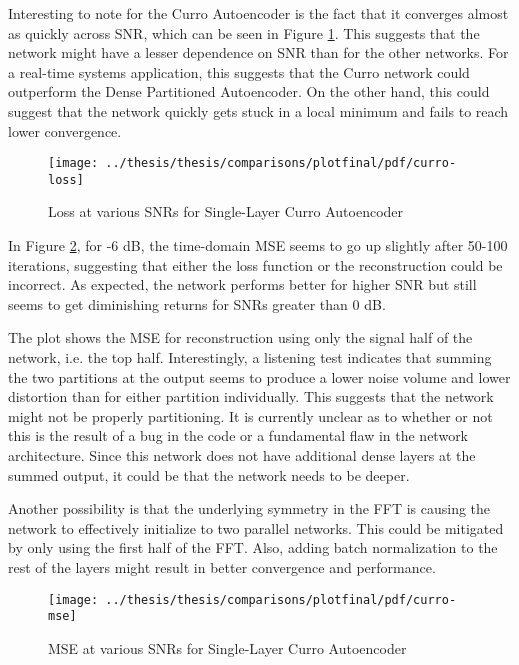 Interesting to note for the Curro Autoencoder is the fact that it converges almost as quickly across SNR, which can be seen in Figure \ref{fig:curro-loss}. This suggests that the network might have a lesser dependence on SNR than for the other networks. For a real-time systems application, this suggests that the Curro network could outperform the Dense Partitioned Autoencoder. On the other hand, this could suggest that the network quickly gets stuck in a local minimum and fails to reach lower convergence.

\begin{figure}[!ht]
\centering
\texttt{[image: ../thesis/thesis/comparisons/plotfinal/pdf/curro-loss]}
\caption{Loss at various SNRs for Single-Layer Curro Autoencoder}\label{fig:curro-loss}
\end{figure}

In Figure \ref{fig:curro-mse}, for -6 dB, the time-domain MSE seems to go up slightly after 50-100 iterations, suggesting that either the loss function or the reconstruction could be incorrect. As expected, the network performs better for higher SNR but still seems to get diminishing returns for SNRs greater than 0 dB.

The plot shows the MSE for reconstruction using only the signal half of the network, i.e. the top half. Interestingly, a listening test indicates that summing the two partitions at the output seems to produce a lower noise volume and lower distortion than for either partition individually. This suggests that the network might not be properly partitioning. It is currently unclear as to whether or not this is the result of a bug in the code or a fundamental flaw in the network architecture. Since this network does not have additional dense layers at the summed output, it could be that the network needs to be deeper.

Another possibility is that the underlying symmetry in the FFT is causing the network to effectively initialize to two parallel networks. This could be mitigated by only using the first half of the FFT. Also, adding batch normalization to the rest of the layers might result in better convergence and performance.

\begin{figure}[!ht]
\centering
\texttt{[image: ../thesis/thesis/comparisons/plotfinal/pdf/curro-mse]}
\caption{MSE at various SNRs for Single-Layer Curro Autoencoder}\label{fig:curro-mse}
\end{figure}

